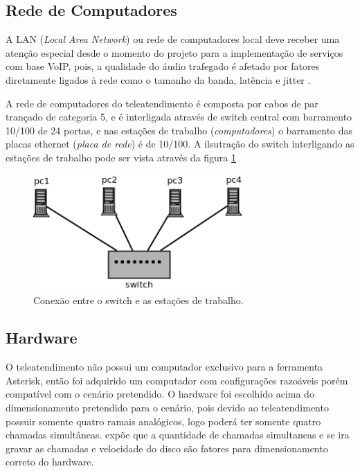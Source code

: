 \subsection{Rede de Computadores}
A LAN (\textit{Local Area Network}) ou rede de computadores local deve receber uma atenção especial desde o momento do projeto para a implementação de serviços com base VoIP, pois, a qualidade do áudio trafegado é afetado por fatores diretamente ligados à rede como o tamanho da banda, latência e jitter \cite{andersonramires2005}.

A rede de computadores do teleatendimento é composta por cabos de par trançado de categoria 5, e é interligada através de switch central com barramento 10/100 de 24 portas, e nas estações de trabalho (\textit{computadores}) o barramento das placas ethernet (\textit{placa de rede}) é de 10/100. A ilsutração do switch interligando as estações de trabalho pode ser vista através da figura \ref{Figura17}

\begin{figure}[h]
	\centering
	\includegraphics[width=8cm]{imagens/switch.png}
	\caption{Conexão entre o switch e as estações de trabalho.}
    \label{Figura17}
\end{figure}

\subsection{Hardware}
O teleatendimento não possui um computador exclusivo para a ferramenta Asterisk, então foi adquirido um computador com configurações razoáveis porém compatível com o cenário pretendido. O hardware foi escolhido acima do dimensionamento pretendido para o cenário, pois devido ao teleatendimento possuir somente quatro ramais analógicos, logo poderá ter somente quatro chamadas simultâneas.  expõe que a quantidade de chamadas simultaneas e se ira gravar as chamadas e velocidade do disco são fatores para dimensionamento correto do hardware. 

